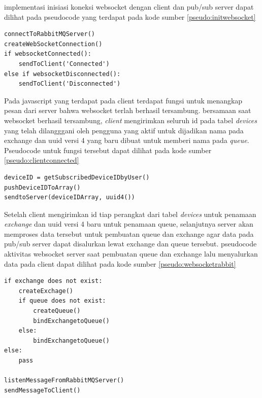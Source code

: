 		implementasi inisiasi koneksi websocket dengan client dan pub/sub server dapat dilihat pada pseudocode yang terdapat pada kode sumber \ref{pseudo:initwebsocket}
		
\begin{lstlisting}[frame=single,breaklines,caption={Pseudocode Inisiasi Komunikasi Websokcet dengan Client dan Pub/Sub Server}, label=pseudo:initwebsocket, captionpos=b]
connectToRabbitMQServer()
createWebSocketConnection()
if websocketConnected():
	sendToClient('Connected')
else if websocketDisconnected():
	sendToClient('Disconnected') 
\end{lstlisting}

		Pada javascript yang terdapat pada client terdapat fungsi untuk menangkap pesan dari server bahwa websocket terlah berhasil tersambung. bersamaan saat websocket berhasil tersambung, \textit{client} mengirimkan seluruh id pada tabel \textit{devices} yang telah dilangggani oleh pengguna yang aktif untuk dijadikan nama pada exchange dan uuid versi 4 yang baru dibuat untuk memberi nama pada \textit{queue}.
		Pseudocode untuk fungsi tersebut dapat dilihat pada kode sumber \ref{pseudo:clientconnected}
		
\begin{lstlisting}[frame=single,breaklines,caption={Pseudocode Aktivitas Client Saat Terkoneksi dengan Websocket},label=pseudo:clientconnected, captionpos=b]
deviceID = getSubscribedDeviceIDbyUser()
pushDeviceIDToArray()
sendtoServer(deviceIDArray, uuid4())
\end{lstlisting}

		Setelah client mengirimkan id tiap perangkat dari tabel \textit{devices} untuk penamaan \textit{exchange} dan uuid versi 4 baru untuk penamaan queue, selanjutnya server akan memproses data tersebut untuk pembuatan queue dan exchange agar data pada pub/sub server dapat disalurkan lewat exchange dan queue tersebut. pseudocode aktivitas websocket server saat pembuatan queue dan exchange lalu menyalurkan data pada client dapat dilihat pada kode sumber \ref{pseudo:websocketrabbit}
		
\begin{lstlisting}[frame=single,breaklines,caption={Pseudocode Aktivitas Websocket Saat Pembuatan Queue dan Exchange Untuk Penyaluran Data ke Client},label=pseudo:websocketrabbit, captionpos=b]
if exchange does not exist:
	createExchage()
	if queue does not exist:
		createQueue()
		bindExchangetoQueue()
	else:
		bindExchangetoQueue()
else:
	pass

listenMessageFromRabbitMQServer()
sendMessageToClient()
\end{lstlisting}
		
